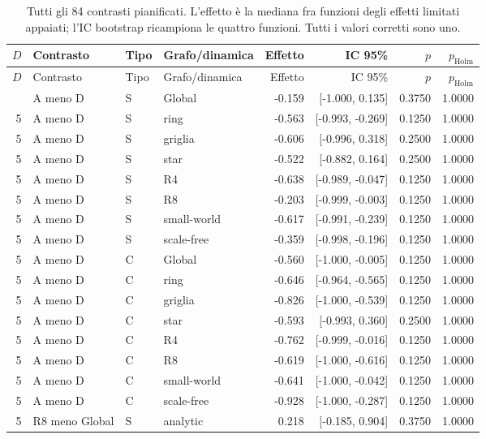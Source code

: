 \small
\begin{longtable}{@{}rlllrrrr@{}}
\caption{Tutti gli 84 contrasti pianificati. L'effetto è la mediana fra funzioni degli effetti limitati appaiati; l'IC bootstrap ricampiona le quattro funzioni. Tutti i valori corretti sono uno.}\label{tab:planned}\\
\toprule $D$ & Contrasto & Tipo & Grafo/dinamica & Effetto & IC 95\% & $p$ & $p_{\mathrm{Holm}}$\\\midrule\endfirsthead
\toprule $D$ & Contrasto & Tipo & Grafo/dinamica & Effetto & IC 95\% & $p$ & $p_{\mathrm{Holm}}$\\\midrule\endhead
\bottomrule\endfoot
5 & A meno D & S & Global & -0.159 & [-1.000, 0.135] & 0.3750 & 1.0000\\
5 & A meno D & S & ring & -0.563 & [-0.993, -0.269] & 0.1250 & 1.0000\\
5 & A meno D & S & griglia & -0.606 & [-0.996, 0.318] & 0.2500 & 1.0000\\
5 & A meno D & S & star & -0.522 & [-0.882, 0.164] & 0.2500 & 1.0000\\
5 & A meno D & S & R4 & -0.638 & [-0.989, -0.047] & 0.1250 & 1.0000\\
5 & A meno D & S & R8 & -0.203 & [-0.999, -0.003] & 0.1250 & 1.0000\\
5 & A meno D & S & small-world & -0.617 & [-0.991, -0.239] & 0.1250 & 1.0000\\
5 & A meno D & S & scale-free & -0.359 & [-0.998, -0.196] & 0.1250 & 1.0000\\
5 & A meno D & C & Global & -0.560 & [-1.000, -0.005] & 0.1250 & 1.0000\\
5 & A meno D & C & ring & -0.646 & [-0.964, -0.565] & 0.1250 & 1.0000\\
5 & A meno D & C & griglia & -0.826 & [-1.000, -0.539] & 0.1250 & 1.0000\\
5 & A meno D & C & star & -0.593 & [-0.993, 0.360] & 0.2500 & 1.0000\\
5 & A meno D & C & R4 & -0.762 & [-0.999, -0.016] & 0.1250 & 1.0000\\
5 & A meno D & C & R8 & -0.619 & [-1.000, -0.616] & 0.1250 & 1.0000\\
5 & A meno D & C & small-world & -0.641 & [-1.000, -0.042] & 0.1250 & 1.0000\\
5 & A meno D & C & scale-free & -0.928 & [-1.000, -0.287] & 0.1250 & 1.0000\\
5 & R8 meno Global & S & analytic & 0.218 & [-0.185, 0.904] & 0.3750 & 1.0000\\

\end{longtable}
